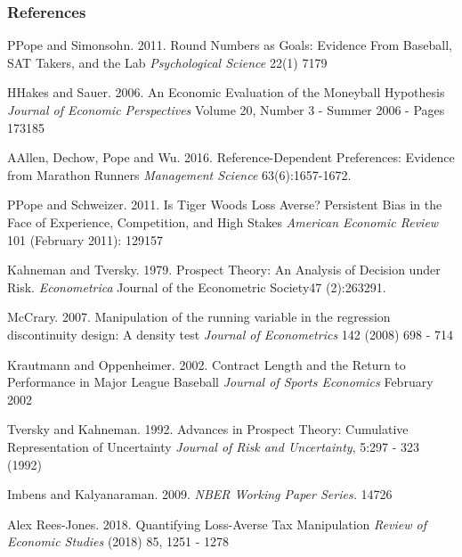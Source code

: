 \documentclass[dvipdfmx,12pt]{beamer}
\begin{document}
\begin{frame}\frametitle{References}
  \tiny
  \begin{thebibliography}{99}
    \bibitem PPope and Simonsohn. 2011.
    Round Numbers as Goals: Evidence From Baseball, SAT Takers, and the Lab
    \textit{Psychological Science} 22(1) 7179

    \bibitem HHakes and Sauer. 2006.
    An Economic Evaluation of the Moneyball Hypothesis
    \textit{Journal of Economic Perspectives} Volume 20, Number 3 - Summer 2006 - Pages 173185

    \bibitem AAllen, Dechow, Pope and Wu. 2016.
    Reference-Dependent Preferences: Evidence from Marathon Runners \textit{Management Science} 63(6):1657-1672.

    \bibitem PPope and Schweizer. 2011.
    Is Tiger Woods Loss Averse? Persistent Bias in the Face of Experience, Competition, and High Stakes
    \textit{American Economic Review} 101 (February 2011): 129157

    \bibitem{}Kahneman and Tversky. 1979.
    Prospect Theory: An Analysis of Decision under Risk.
    \textit{Econometrica}
    Journal of the Econometric Society47 (2):263291.

    \bibitem{}McCrary. 2007.
    Manipulation of the running variable in the regression discontinuity design: A density test
    \textit{Journal of Econometrics} 142 (2008) 698 - 714

    \bibitem{}Krautmann and Oppenheimer. 2002.
    Contract Length and the Return to Performance in Major League Baseball
    \textit{Journal of Sports Economics} February 2002

    \bibitem{}Tversky and Kahneman. 1992.
    Advances in Prospect Theory: Cumulative Representation of Uncertainty
    \textit{Journal of Risk and Uncertainty}, 5:297 - 323 (1992)

    \bibitem{}Imbens and Kalyanaraman. 2009.
    \textit{NBER Working Paper Series.} 14726

    \bibitem{}Alex Rees-Jones. 2018.
    Quantifying Loss-Averse Tax Manipulation
    \textit{Review of Economic Studies} (2018) 85, 1251 - 1278
  \end{thebibliography}
\end{frame}
\end{document}
